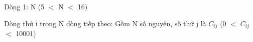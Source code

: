 Dòng 1: N (5 $<$ N $<$ 16)  

   Dòng thứ i trong N dòng tiếp theo: Gồm N số nguyên, số thứ j là $C_{ij}$   (0 $<$ $C_{ij}$   $<$ 10001)